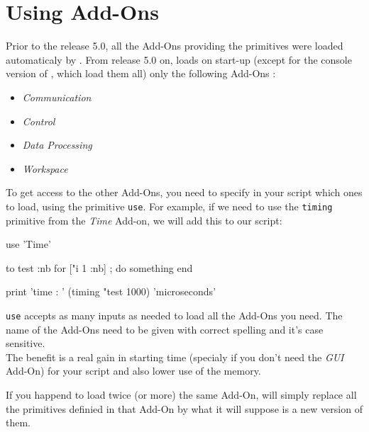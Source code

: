 \section{Using Add-Ons}
 
Prior to the release 5.0, all the Add-Ons providing the primitives were loaded automaticaly by \squirrel. From release 5.0 on, \squirrel loads on start-up
(except for the console version of \squirrel, which load them all) only the following Add-Ons :

\begin{itemize}
\item {\it Communication}
\item {\it Control}
\item {\it Data Processing}
\item {\it Workspace}
\end{itemize}

To get access to the other Add-Ons, you need to specify in your script which ones to load, using the primitive {\tt use}. For example, if we need to use the {\tt timing} primitive from the {\it Time} Add-on, we will add this to our script:

\begin{verbatimtab}
use 'Time'

to test :nb
	for ["i 1 :nb] {
		; do something		
	}
end

print 'time : ' (timing "test 1000) 'microseconds'
\end{verbatimtab}

{\tt use} accepts as many inputs as needed to load all the Add-Ons you need. The name of the Add-Ons need to be given with correct spelling and it's case sensitive.\\

The benefit is a real gain in starting time (specialy if you don't need the {\it GUI} Add-On) for your script and also lower use of the memory.

If you happend to load twice (or more) the same Add-On, \squirrel will simply replace all the primitives definied in that Add-On by what it will suppose is a new version of them.
